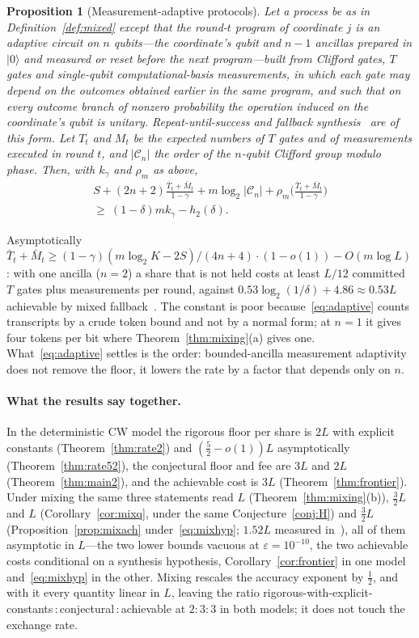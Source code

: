\documentclass[aps,prx,twocolumn,superscriptaddress,nofootinbib,longbibliography]{revtex4-2}
\theoremstyle{plain}
\newtheorem{proposition}{Proposition}
\theoremstyle{definition}
\theoremstyle{remark}
\begin{document}
\begin{proposition}[Measurement-adaptive protocols]\label{prop:adaptive}
Let a process be as in Definition~\ref{def:mixed} except that the round-$t$ program of coordinate $j$ is an adaptive circuit on $n$ qubits---the coordinate's qubit and $n-1$ ancillas prepared in $|0\rangle$ and measured or reset before the next program---built from Clifford gates, $T$ gates and single-qubit computational-basis measurements, in which each gate may depend on the outcomes obtained earlier in the same program, and such that on every outcome branch of nonzero probability the operation induced on the coordinate's qubit is unitary. Repeat-until-success and fallback synthesis~\cite{BRS,KLMPP} are of this form. Let $T_t$ and $M_t$ be the expected numbers of $T$ gates and of measurements executed in round $t$, and $|\mathcal C_n|$ the order of the $n$-qubit Clifford group modulo phase. Then, with $k_\gamma$ and $\rho_m$ as above,
\begin{multline}\label{eq:adaptive}
S+(2n+2)\frac{\bar T_t+\bar M_t}{1-\gamma}+m\log_2|\mathcal C_n|+\rho_m\Big(\frac{\bar T_t+\bar M_t}{1-\gamma}\Big)\\ \ge\ (1-\delta)mk_\gamma-h_2(\delta).
\end{multline}
\end{proposition}
Asymptotically $\bar T_t+\bar M_t\ge(1-\gamma)(m\log_2K-2S)/(4n+4)\cdot(1-o(1))-O(m\log L)$: with one ancilla ($n=2$) a share that is not held costs at least $L/12$ committed $T$ gates plus measurements per round, against $0.53\log_2(1/\delta)+4.86\approx0.53L$ achievable by mixed fallback~\cite[Eq.~(13)]{KLMPP,Bothe}. The constant is poor because~\eqref{eq:adaptive} counts transcripts by a crude token bound and not by a normal form; at $n=1$ it gives four tokens per bit where Theorem~\ref{thm:mixing}(a) gives one. What~\eqref{eq:adaptive} settles is the order: bounded-ancilla measurement adaptivity does not remove the floor, it lowers the rate by a factor that depends only on $n$.

\paragraph{What the results say together.} In the deterministic CW model the rigorous floor per share is $2L$ with explicit constants (Theorem~\ref{thm:rate2}) and $(\tfrac52-o(1))L$ asymptotically (Theorem~\ref{thm:rate52}), the conjectural floor and fee are $3L$ and $2L$ (Theorem~\ref{thm:main2}), and the achievable cost is $3L$ (Theorem~\ref{thm:frontier}). Under mixing the same three statements read $L$ (Theorem~\ref{thm:mixing}(b)), $\tfrac32L$ and $L$ (Corollary~\ref{cor:mixq}, under the same Conjecture~\ref{conj:H}) and $\tfrac32L$ (Proposition~\ref{prop:mixach} under~\eqref{eq:mixhyp}; $1.52L$ measured in~\cite{KLMPP}), all of them asymptotic in $L$---the two lower bounds vacuous at $\varepsilon=10^{-10}$, the two achievable costs conditional on a synthesis hypothesis, Corollary~\ref{cor:frontier} in one model and~\eqref{eq:mixhyp} in the other. Mixing rescales the accuracy exponent by $\tfrac12$, and with it every quantity linear in $L$, leaving the ratio rigorous-with-explicit-constants\,:\,conjectural\,:\,achievable at $2:3:3$ in both models; it does not touch the exchange rate.
\end{document}
